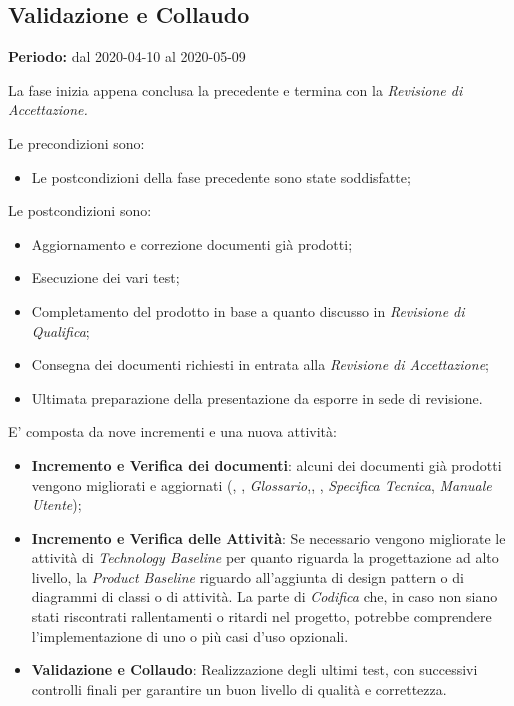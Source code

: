 \subsection{Validazione e Collaudo}
\label{validazione_e_collaudo}
\textbf{Periodo:} dal 2020-04-10 al 2020-05-09

La fase inizia appena conclusa la precedente e termina con la \textit{Revisione di Accettazione.}

Le precondizioni sono:
\begin{itemize}
    \item Le postcondizioni della fase precedente sono state soddisfatte;
\end{itemize}

Le postcondizioni sono:
\begin{itemize}
    \item Aggiornamento e correzione documenti già prodotti;
    \item Esecuzione dei vari test;
    \item Completamento del prodotto in base a quanto discusso in \textit{Revisione di Qualifica};
    \item Consegna dei documenti richiesti in entrata alla \textit{Revisione di Accettazione};
    \item Ultimata preparazione della presentazione da esporre in sede di revisione.
\end{itemize}

E' composta da nove incrementi e una nuova attività:
\begin{itemize}
    \item \textbf{Incremento e Verifica dei documenti}: alcuni dei documenti già prodotti vengono migliorati e aggiornati (\textit{\NdP}, \textit{\PdP}, \textit{Glossario},\textit{\PdQ}, , \textit{Specifica Tecnica}, \textit{Manuale Utente}); 
    \item \textbf{Incremento e Verifica delle Attività}: Se necessario vengono migliorate le attività di \textit{Technology Baseline} per quanto riguarda la progettazione ad alto livello, la \textit{Product Baseline} riguardo all'aggiunta di design pattern o di diagrammi di classi o di attività. La parte di \textit{Codifica} che, in caso non siano stati riscontrati rallentamenti o ritardi nel progetto, potrebbe comprendere l'implementazione di uno o più casi d'uso opzionali.
    \item \textbf{Validazione e Collaudo}: Realizzazione degli ultimi test, con successivi controlli finali per garantire un buon livello di qualità e correttezza.
\end{itemize}

